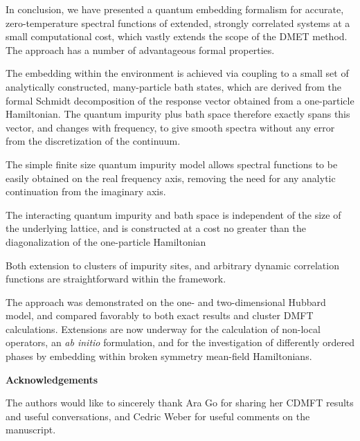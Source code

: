 \documentclass[aps,twocolumn,nobibnotes]{revtex4}
\begin{document}
In conclusion, we have presented a quantum embedding formalism for accurate, zero-temperature spectral functions of extended, strongly correlated systems 
at a small computational cost, which vastly 
extends the scope of the DMET method. The approach has a number of 
advantageous formal properties. 
\begin{inparaenum}
\item The embedding within the environment is achieved via coupling to a small set of analytically constructed, many-particle bath states,
    which are derived from the formal Schmidt decomposition of the response vector obtained from a one-particle Hamiltonian. The quantum impurity
    plus bath space therefore exactly spans this vector, and
    changes with frequency, to give smooth spectra without any error from the discretization of the continuum.
\item The simple finite size quantum impurity model allows spectral functions to be easily obtained on the real frequency axis, removing the 
    need for any analytic continuation from the imaginary axis.
\item The interacting quantum impurity and bath space is independent of the size of the underlying lattice, and is constructed at a cost no greater than the
    diagonalization of the one-particle Hamiltonian
\item Both extension to clusters of impurity sites, and arbitrary dynamic correlation functions are straightforward within the framework.
\end{inparaenum}
The approach was demonstrated on the one- and two-dimensional Hubbard model, and compared favorably to both exact results and cluster DMFT calculations. Extensions are now underway for the
calculation of non-local operators, an {\em ab initio} formulation, and for the investigation of differently ordered phases by embedding within broken symmetry mean-field Hamiltonians.

{\bf Acknowledgements}

The authors would like to sincerely thank Ara Go for sharing her CDMFT results and useful conversations, and Cedric Weber for useful comments on the manuscript.


\end{document}
